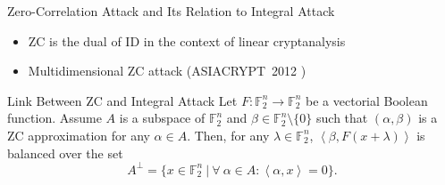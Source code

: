 \documentclass[table,aspectratio=169]{beamer}
\begin{document}

\begin{frame}{Zero-Correlation Attack and Its Relation to Integral Attack}
\begin{itemize}
\item ZC is the dual of ID in the context of linear cryptanalysis \cite{dcc_BogdanovR14}
\item Multidimensional ZC attack (ASIACRYPT~2012 \cite{asiacrypt_BogdanovLNW12})
\end{itemize}
\begin{block}{Link Between ZC and Integral Attack \textcolor{white}{\cite{crypto_SunLRLCWAL15}}}
Let $F:\mathbb{F}_{2}^{n}\rightarrow \mathbb{F}_{2}^{n}$ be a vectorial Boolean function. 
Assume $A$ is a subspace of $\mathbb{F}_{2}^{n}$ and $\beta\in \mathbb{F}_{2}^{n}\setminus \{0\}$
such that $(\alpha, \beta)$ is a ZC approximation for any $\alpha \in A$. 
Then, for any $\lambda \in \mathbb{F}_{2}^{n}$, $\left\langle \beta, F(x + \lambda)\right\rangle$ is balanced over the set
\[A^{\bot} = \{x \in \mathbb{F}_{2}^{n}~|~ \forall ~ \alpha \in A:\left\langle \alpha, x \right\rangle = 0\}.\]
\end{block}
\end{frame}
\end{document}
